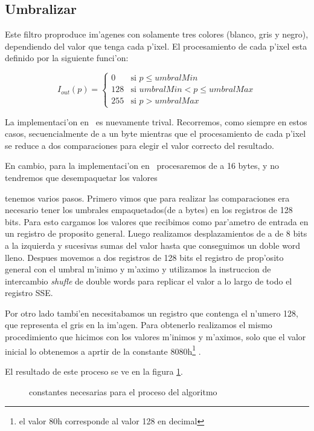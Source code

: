 \subsection{Umbralizar}
Este filtro proproduce im'agenes con solamente tres colores (blanco, gris y negro), dependiendo del valor que tenga cada p'ixel.
El procesamiento de cada p'ixel esta definido por la siguiente funci'on:

$$I_{out}(p) = \left\{\begin{array}{lcc} 0 & \text{si } p \leq umbralMin\\  128 & \text{si } umbralMin < p \leq umbralMax \\ 255 & \text{si } p > umbralMax \end{array} \right. $$

La implementaci'on en \C\ es nuevamente trival. Recorremos, como siempre en estos casos, secuencialmente de a un byte mientras que el procesamiento de cada p'ixel se reduce a dos comparaciones para elegir el valor correcto del resultado.

En cambio, para la implementaci'on en \ass\ procesaremos de a 16 bytes, y no tendremos que desempaquetar los valores

tenemos varios pasos. Primero vimos que para realizar las comparaciones era necesario tener los umbrales empaquetados(de a bytes) en los registros de 128 bits. Para esto cargamos los valores que recibimos como par'ametro de entrada en un registro de proposito general. Luego realizamos desplazamientos de a de 8 bits a la izquierda y sucesivas sumas del valor hasta que conseguimos un doble word lleno. Despues movemos a dos registros de 128 bits el registro de prop'osito general con el umbral m'inimo y m'aximo y utilizamos la instruccion de intercambio \textit{shufle} de double words para replicar el valor a lo largo de todo el registro SSE. 

Por otro lado tambi'en necesitabamos un registro que contenga el n'umero 128, que representa el gris en la im'agen.
Para obtenerlo realizamos el mismo procedimiento que hicimos con los valores m'inimos y m'aximos, solo que el valor inicial lo obtenemos a aprtir de la constante 8080h\footnote{el valor 80h corresponde al valor 128 en decimal} .

El resultado de este proceso se ve en la figura \ref{est:u-uno}.

\begin{figure}[h!]
\caption{constantes necesarias para el proceso del algoritmo}
\label{est:u-uno}
\end{figure}


